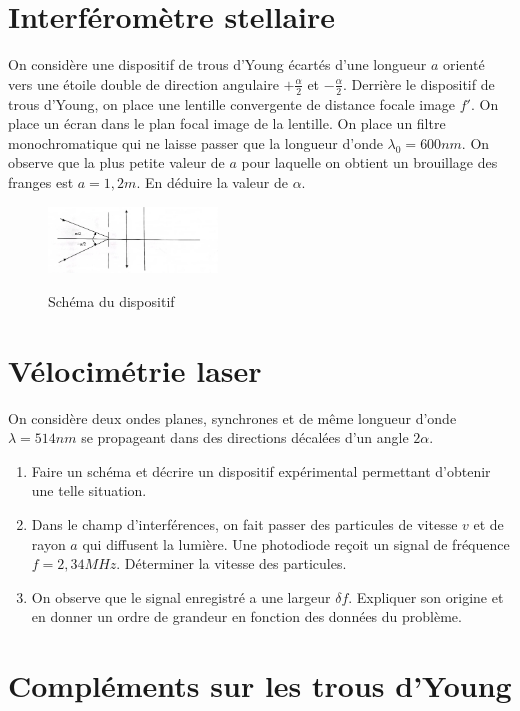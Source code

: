 \documentclass{article}
\begin{document}
\section{Interféromètre stellaire}
On considère une dispositif de trous d'Young écartés d'une longueur $a$ orienté vers une étoile double de direction angulaire $+ \frac{\alpha}{2}$ et $- \frac{ \alpha}{2}$. 
Derrière le dispositif de trous d'Young, on place une lentille convergente de distance focale image $f'$. 
On place un écran dans le plan focal image de la lentille. 
On place un filtre monochromatique qui ne laisse passer que la longueur d'onde $\lambda_0 = 600nm.$
On observe que la plus petite valeur de $a$ pour laquelle on obtient un brouillage des franges est $a=1,2m$. 
En déduire la valeur de $\alpha$. 



\begin{figure}[h!]
  \centering
  \includegraphics[width=0.4\textwidth]{interféromètre stellaire .jpg}
  \label{fig:maison}
    \caption{Schéma du dispositif}
\end{figure}

\section{Vélocimétrie laser}

On considère deux ondes planes, synchrones et de même longueur d'onde $\lambda = 514 nm$ se propageant dans des directions décalées d'un angle $2 \alpha$. 
\begin{enumerate}
  \item Faire un schéma et décrire un dispositif expérimental permettant d'obtenir une telle situation. 
  \item Dans le champ d'interférences, on fait passer des particules de vitesse $v$ et de rayon $a$ qui diffusent la lumière. Une photodiode reçoit un signal de fréquence $f=2,34MHz$. Déterminer la vitesse des particules. 
  \item On observe que le signal enregistré a une largeur $\delta f$. Expliquer son origine et en donner un ordre de grandeur en fonction des données du problème. 
\end{enumerate} 

\section{Compléments sur les trous d'Young}
\end{document}
